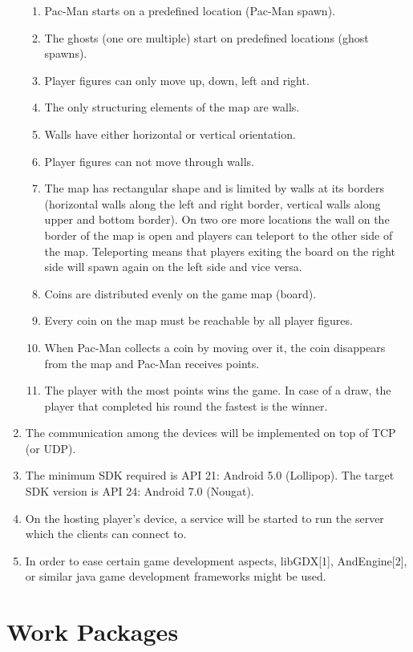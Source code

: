 \documentclass{report}
\begin{document}
\begin{enumerate}
	\begin{enumerate}
		\item Pac-Man starts on a predefined location (Pac-Man spawn).
		\item The ghosts (one ore multiple) start on predefined locations (ghost spawns).
		\item Player figures can only move up, down, left and right.
		\item The only structuring elements of the map are walls.
		\item Walls have either horizontal or vertical orientation.
		\item Player figures can not move through walls.
		\item The map has rectangular shape and is limited by walls at its borders (horizontal walls along the left and right border, vertical walls along upper and bottom border). On two ore more locations the wall on the border of the map is open and players can teleport to the other side of the map. Teleporting means that players exiting the board on the right side will spawn again on the left side and vice versa.
		\item Coins are distributed evenly on the game map (board).
		\item Every coin on the map must be reachable by all player figures. 
		\item When Pac-Man collects a coin by moving over it, the coin disappears from the map and Pac-Man receives points.
		\item The player with the most points wins the game. In case of a draw, the player that completed his round the fastest is the winner.
	\end{enumerate}
	
	\item The communication among the devices will be implemented on top of TCP (or UDP).
	\item The minimum SDK required is API 21: Android 5.0 (Lollipop). The target SDK version is API 24: Android 7.0 (Nougat).
	\item On the hosting player's device, a service will be started to run the server which the clients can connect to.
	\item In order to ease certain game development aspects, libGDX[1], AndEngine[2], or similar java game development frameworks might be used.
	
\end{enumerate}


\section{Work Packages}
\end{document}
